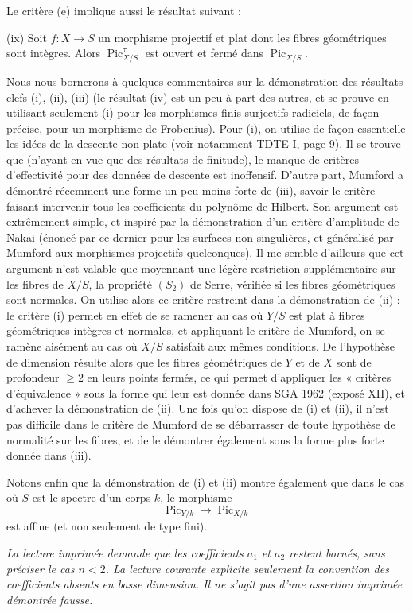 Le critère (e) implique aussi le résultat suivant :

\medskip
\noindent(ix) Soit $f:X\longrightarrow S$ un morphisme projectif et plat dont
les fibres géométriques sont intègres. Alors
$\operatorname{Pic}_{X/S}^\tau$ est ouvert et fermé dans
$\operatorname{Pic}_{X/S}$.

Nous nous bornerons à quelques commentaires sur la démonstration des
résultats-clefs (i), (ii), (iii) (le résultat (iv) est un peu à part des
autres, et se prouve en utilisant seulement (i) pour les morphismes finis
surjectifs radiciels, de façon précise, pour un morphisme de Frobenius). Pour
(i), on utilise de façon essentielle les idées de la descente non plate (voir
notamment TDTE I, page 9). Il se trouve que (n'ayant en vue que des résultats
de finitude), le manque de critères d'effectivité pour des données de descente
est inoffensif. D'autre part, Mumford a démontré récemment une forme un peu
moins forte de (iii), savoir le critère faisant intervenir tous les
coefficients du polynôme de Hilbert. Son argument est extrêmement simple, et
inspiré par la démonstration d'un critère d'amplitude de Nakai (énoncé par ce
dernier pour les surfaces non singulières, et généralisé par Mumford aux
morphismes projectifs quelconques). Il me semble d'ailleurs que cet argument
n'est valable que moyennant une légère restriction supplémentaire sur les
fibres de $X/S$, la propriété $(S_2)$ de Serre, vérifiée si les fibres
géométriques sont normales. On utilise alors ce critère restreint dans la
démonstration de (ii) : le critère (i) permet en effet de se ramener au cas où
$Y/S$ est plat à fibres géométriques intègres et normales, et appliquant le
critère de Mumford, on se ramène aisément au cas où $X/S$ satisfait aux mêmes
conditions. De l'hypothèse de dimension résulte alors que les fibres
géométriques de $Y$ et de $X$ sont de profondeur $\geq2$ en leurs points
fermés, ce qui permet d'appliquer les « critères d'équivalence » sous la forme
qui leur est donnée dans SGA 1962 (exposé XII), et d'achever la démonstration de
(ii). Une fois qu'on dispose de (i) et (ii), il n'est pas difficile dans le
critère de Mumford de se débarrasser de toute hypothèse de normalité sur les
fibres, et de le démontrer également sous la forme plus forte donnée dans
(iii).

Notons enfin que la démonstration de (i) et (ii) montre également que dans le
cas où $S$ est le spectre d'un corps $k$, le morphisme
\[
\operatorname{Pic}_{Y/k}\longrightarrow\operatorname{Pic}_{X/k}
\]
est affine (et non seulement de type fini).

\par\smallskip
\begingroup\footnotesize
\noindent\textit{La lecture imprimée demande que les coefficients $a_1$ et $a_2$ restent bornés, sans préciser le cas $n<2$. La lecture courante explicite seulement la convention des coefficients absents en basse dimension. Il ne s'agit pas d'une assertion imprimée démontrée fausse.}\par
\endgroup
